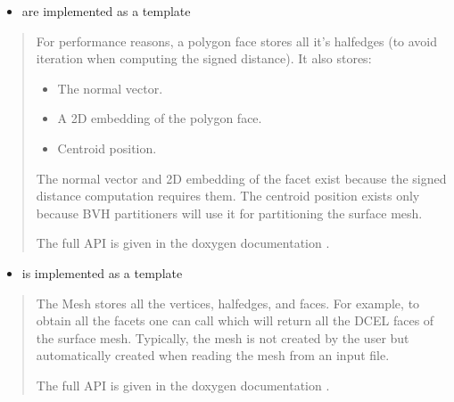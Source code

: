 \documentclass[letterpaper,10pt,english]{sphinxmanual}
\begin{document}
\begin{itemize}
\item {} 
\sphinxAtStartPar
{} are implemented as a template 

\end{itemize}
\begin{quote}

\begin{sphinxVerbatim}[commandchars=\\\{\}]
  
 
\end{sphinxVerbatim}

\sphinxAtStartPar
For performance reasons, a polygon face stores all it’s half\sphinxhyphen{}edges (to avoid iteration when computing the signed distance).
It also stores:
\begin{itemize}
\item {} 
\sphinxAtStartPar
The normal vector.

\item {} 
\sphinxAtStartPar
A 2D embedding of the polygon face.

\item {} 
\sphinxAtStartPar
Centroid position.

\end{itemize}

\sphinxAtStartPar
The normal vector and 2D embedding of the facet exist because the signed distance computation requires them.
The centroid position exists only because BVH partitioners will use it for partitioning the surface mesh.

\sphinxAtStartPar
The full API is given in the doxygen documentation .
\end{quote}
\begin{itemize}
\item {} 
\sphinxAtStartPar
{} is implemented as a template 

\end{itemize}
\begin{quote}

\begin{sphinxVerbatim}[commandchars=\\\{\}]
  
 
\end{sphinxVerbatim}

\sphinxAtStartPar
The Mesh stores all the vertices, half\sphinxhyphen{}edges, and faces.
For example, to obtain all the facets one can call  which will return all the DCEL faces of the surface mesh.
Typically, the mesh is not created by the user but automatically created when reading the mesh from an input file.

\sphinxAtStartPar
The full API is given in the doxygen documentation .
\end{quote}
\end{document}
